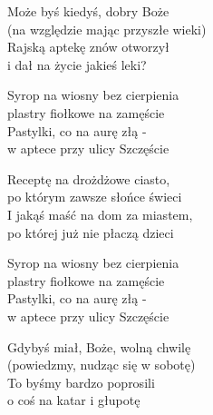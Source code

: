 \begin{text}
    Może byś kiedyś, dobry Boże\\
    (na względzie mając przyszłe wieki)\\
    Rajską aptekę znów otworzył\\
    i dał na życie jakieś leki?

    Syrop na wiosny bez cierpienia\\
    plastry fiołkowe na zamęście\\
    Pastylki, co na aurę złą -\\
    w aptece przy ulicy Szczęście

    Receptę na drożdżowe ciasto,\\
    po którym zawsze słońce świeci\\
    I jakąś maść na dom za miastem,\\
    po której już nie płaczą dzieci

    Syrop na wiosny bez cierpienia\\
    plastry fiołkowe na zamęście\\
    Pastylki, co na aurę złą -\\
    w aptece przy ulicy Szczęście

    Gdybyś miał, Boże, wolną chwilę\\
    (powiedzmy, nudząc się w sobotę)\\
    To byśmy bardzo poprosili\\
    o coś na katar i głupotę
\end{text}
\begin{chord}

\end{chord}